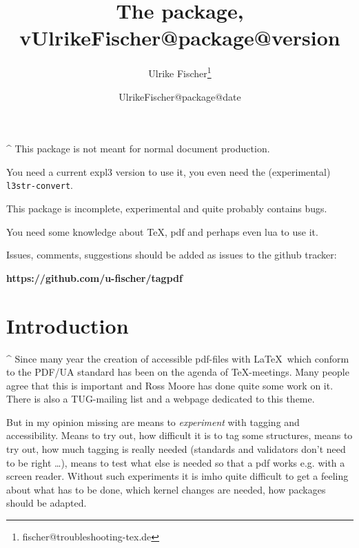 \documentclass[DIV=12,parskip=half-,bibliography=totoc]{scrartcl}
\title{The \pkg{tagpdf} package, v\csname UlrikeFischer@package@version\endcsname}
\date{\csname UlrikeFischer@package@date\endcsname}
\author{Ulrike Fischer\thanks{fischer@troubleshooting-tex.de}}
\begin{document}

 \maketitle
 \tagmcend
\tagstructend

\begin{tcolorbox}[colframe=red]
\TagP^ This package is not meant for normal document production.

\TagP You need a current expl3 version to use it, you even need the (experimental) \texttt{l3str-convert}.

\TagP This package is incomplete, experimental and quite probably contains bugs.

\TagP You need some knowledge about \TeX, pdf and perhaps even lua to use it.

\medskip

\TagP Issues, comments, suggestions should be added as issues to the github tracker:

\medskip
\centering \textbf{https://github.com/u-fischer/tagpdf}

\TagPend

\tagstructend %
\end{tcolorbox}

\tableofcontents

\section{Introduction}


\TagP^ Since many year the creation of accessible pdf-files with \LaTeX\ which conform to the PDF/UA standard has been on the agenda of \TeX-meetings. Many people agree that this is important and Ross Moore has done quite some work on it. There is also a TUG-mailing list and a webpage \parencite{tugaccess} dedicated to this theme.

\TagP But in my opinion missing are means to \emph{experiment} with tagging and accessibility. Means to try out, how difficult it is to tag some structures, means to try out, how much tagging is really needed (standards and validators don't need to be right \ldots), means to test what else is needed so that a pdf works e.g. with a screen reader. Without such experiments it is imho quite difficult to get a feeling about what has to be done, which kernel changes are needed, how packages should be adapted.
\end{document}
